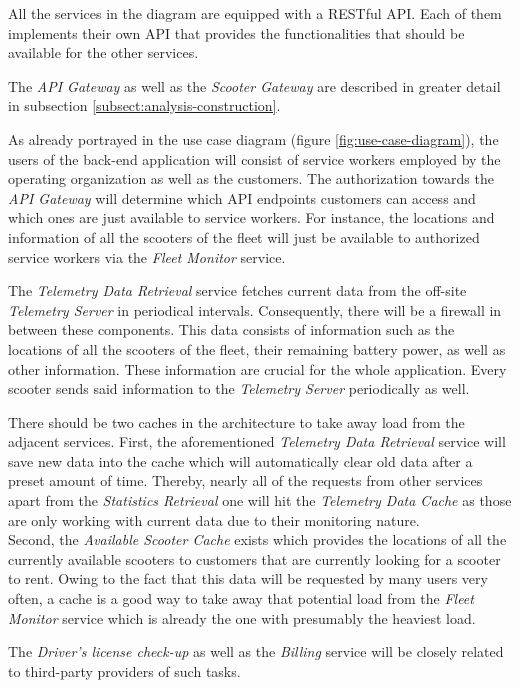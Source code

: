 \documentclass[12pt,a4paper]{report}
\begin{document}
All the services in the diagram are equipped with a RESTful API.
Each of them implements their own API that provides the functionalities that
should be available for the other services.

The \textit{API Gateway} as well as the \textit{Scooter Gateway} are described
in greater detail in subsection \ref{subsect:analysis-construction}.

As already portrayed in the use case diagram (figure \ref{fig:use-case-diagram}),
the users of the back-end application will consist of service workers employed
by the operating organization as well as the customers.
The authorization towards the \textit{API Gateway} will determine which
API endpoints customers can access and which ones are just available to
service workers. For instance, the locations and information of all the scooters
of the fleet will just be available to authorized service workers via the
\textit{Fleet Monitor} service.

The \textit{Telemetry Data Retrieval} service fetches current data from the
off-site \textit{Telemetry Server} in periodical intervals.
Consequently, there will be a firewall in between these components.
This data consists of information such as the locations of all the scooters
of the fleet, their remaining battery power, as well as other information.
These information are crucial for the whole application.
Every scooter sends said information to the \textit{Telemetry Server}
periodically as well.

There should be two caches in the architecture to take away load from the
adjacent services. First, the aforementioned \textit{Telemetry Data Retrieval}
service will save new data into the cache which will automatically clear old
data after a preset amount of time. Thereby, nearly all of the requests from
other services apart from the \textit{Statistics Retrieval} one will hit the
\textit{Telemetry Data Cache} as those are only working with current data due
to their monitoring nature.\\
Second, the \textit{Available Scooter Cache} exists which provides the locations
of all the currently available scooters to customers that are currently looking
for a scooter to rent. Owing to the fact that this data will be requested by
many users very often, a cache is a good way to take away that potential load
from the \textit{Fleet Monitor} service which is already the one with
presumably the heaviest load.

The \textit{Driver's license check-up} as well as the \textit{Billing} service
will be closely related to third-party providers of such tasks.\\
\end{document}
